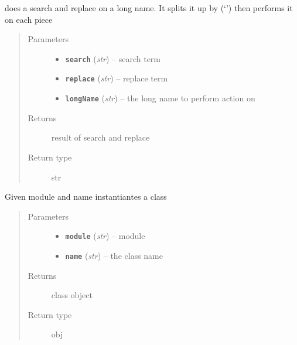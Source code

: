 \documentclass[letterpaper,10pt,english]{sphinxmanual}
\begin{document}

\begin{fulllineitems}
\label{zBuilder:zBuilder.nodeCollection.replace_longname}
does a search and replace on a long name.  It splits it up by (`\textbar{}') then
performs it on each piece
\begin{quote}\begin{description}
\item[{Parameters}] \leavevmode\begin{itemize}
\item {} 
\textbf{\texttt{search}} (\emph{str}) -- search term

\item {} 
\textbf{\texttt{replace}} (\emph{str}) -- replace term

\item {} 
\textbf{\texttt{longName}} (\emph{str}) -- the long name to perform action on

\end{itemize}

\item[{Returns}] \leavevmode
result of search and replace

\item[{Return type}] \leavevmode
str

\end{description}\end{quote}

\end{fulllineitems}


\begin{fulllineitems}
\label{zBuilder:zBuilder.nodeCollection.str_to_class}
Given module and name instantiantes a class
\begin{quote}\begin{description}
\item[{Parameters}] \leavevmode\begin{itemize}
\item {} 
\textbf{\texttt{module}} (\emph{str}) -- module

\item {} 
\textbf{\texttt{name}} (\emph{str}) -- the class name

\end{itemize}

\item[{Returns}] \leavevmode
class object

\item[{Return type}] \leavevmode
obj

\end{description}\end{quote}

\end{fulllineitems}
\end{document}
